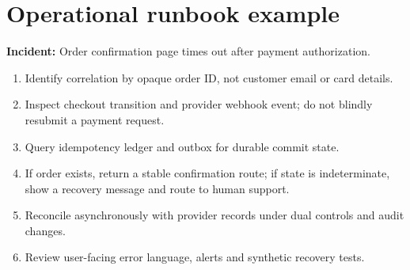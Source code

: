 \documentclass[11pt]{article}
\begin{document}
\section{Operational runbook example}

\textbf{Incident:} Order confirmation page times out after payment authorization.
\begin{enumerate}
\item Identify correlation by opaque order ID, not customer email or card details.
\item Inspect checkout transition and provider webhook event; do not blindly resubmit a payment request.
\item Query idempotency ledger and outbox for durable commit state.
\item If order exists, return a stable confirmation route; if state is indeterminate, show a recovery message and route to human support.
\item Reconcile asynchronously with provider records under dual controls and audit changes.
\item Review user-facing error language, alerts and synthetic recovery tests.
\end{enumerate}


\clearpage

\end{document}
